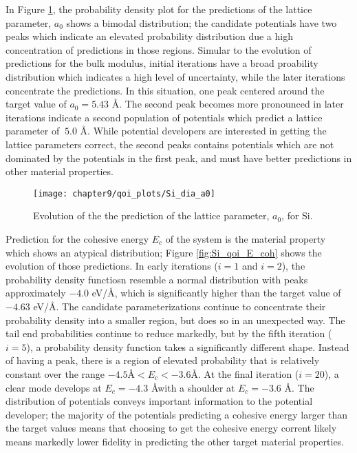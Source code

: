 In Figure \ref{fig:Si_qoi_a0}, the probability density plot for the predictions of the lattice parameter, $a_0$ shows a bimodal distribution; the candidate potentials have two peaks which indicate an elevated probability distribution due a high concentration of predictions in those regions.
Simular to the evolution of predictions for the bulk modulus, initial iterations have a broad proability distribution which indicates a high level of uncertainty, while the later iterations concentrate the predictions.
In this situation, one peak centered around the target value of $a_0=5.43$ \AA.  The second peak becomes more pronounced in later iterations indicate a second population of potentials which predict a lattice parameter of $~5.0$ \AA.
While potential developers are interested in getting the lattice parameters correct, the second peaks contains potentials which are not dominated by the potentials in the first peak, and must have better predictions in other material properties.
\begin{figure}[h]
	\centering
	\texttt{[image: chapter9/qoi\_plots/Si\_dia\_a0]}
	\caption{Evolution of the the prediction of the lattice parameter, $a_0$, for Si.}
	\label{fig:Si_qoi_a0}
\end{figure}

Prediction for the cohesive energy $E_c$ of the system is the material property which shows an atypical distribution; Figure \ref{fig:Si_qoi_E_coh} shows the evolution of those predictions.
In early iterations ($i=1$ and $i=2$), the probability density functiosn resemble a normal distribution with peaks approximately $-4.0$ eV/\AA, which is significantly higher than the target value of $-4.63$ eV/\AA.
The candidate parameterizations continue to concentrate their probability density into a smaller region, but does so in an unexpected way.
The tail end probabilities continue to reduce markedly, but by the fifth iteration ($i=5$), a probability density function takes a significantly different shape.
Instead of having a peak, there is a region of elevated probability that is relatively constant over the range $-4.5 \text{\AA} < E_c < -3.6 \text{\AA}$.
At the final iteration ($i=20$), a clear mode develops at $E_c=-4.3$ \AA with a shoulder at $E_c=-3.6$ \AA.
The distribution of potentials conveys important information to the potential developer; the majority of the potentials predicting a cohesive energy larger than the target values means that choosing to get the cohesive energy corrent likely means markedly lower fidelity in predicting the other target material properties.

